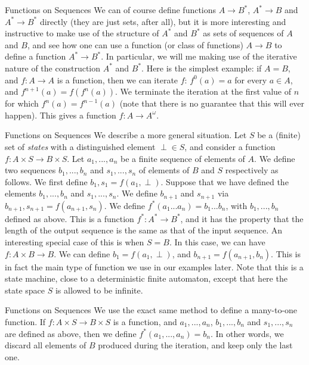 \documentclass[10pt]{beamer}
\begin{document}
\begin{frame}{Functions on Sequences}
We can of course define functions $A\to B^*$, $A^*\to B$ and $A^*\to B^*$ directly (they are just sets, after all), but it is more interesting and instructive to make use of the structure of $A^*$ and $B^*$ as sets of sequences of $A$ and $B$, and see how one can use a function (or class of functions) $A\to B$ to define a function $A^*\to B^*$. In particular, we will me making use of the iterative nature of the construction $A^*$ and $B^*$. Here is the simplest example: if $A=B$, and $f:A\to A$ is a function, then we can iterate $f$: $f^0(a)=a$ for every $a\in A$, and $f^{n+1}(a) = f(f^n(a))$. We terminate the iteration at the first value of $n$ for which $f^n(a)=f^{n-1}(a)$ (note that there is no guarantee that this will ever happen). This gives a function $f:A\to A^\omega$.
\end{frame}

\begin{frame}{Functions on Sequences}
We describe a more general situation. Let $S$ be a (finite) set of {\em states} with a distinguished element $\perp\in S$, and consider a function $f:A\times S\to B\times S$. Let $a_1,...,a_n$ be a finite sequence of elements of $A$.  We define two sequences $b_1,...,b_n$ and $s_1,...,s_n$ of elements of $B$ and $S$ respectively as follows.  We first define $b_1, s_1 = f(a_1, \perp)$.  Suppose that we have defined the elements $b_1,...,b_n$ and $s_1,...,s_n$.  We define $b_{n+1}$ and $s_{n+1}$ via $b_{n+1}, s_{n+1} = f(a_{n+1}, s_n)$.  We define $f^*(a_1...a_n)=b_1...b_n$, with $b_1,...,b_n$ defined as above.  This is a function $f^*:A^*\to B^*$, and it has the property that the length of the output sequence is the same as that of the input sequence.  An interesting special case of this is when $S=B$. In this case, we can have $f:A\times B\to B$. We can define $b_1 = f(a_1, \perp)$, and $b_{n+1}=f(a_{n+1}, b_n)$. This is in fact the main type of function we use in our examples later. Note that this is a state machine, close to a deterministic finite automaton, except that here the state space $S$ is allowed to be infinite.
\end{frame}

\begin{frame}{Functions on Sequences}
We use the exact same method to define a many-to-one function. If $f:A\times S\to B\times S$ is a function, and  $a_1,...,a_n$, $b_1,...,b_n$ and $s_1,...,s_n$ are defined as above, then we define $f^*(a_1,...,a_n)=b_n$.  In other words, we discard all elements of $B$ produced during the iteration, and keep only the last one.
\end{frame}
\end{document}
